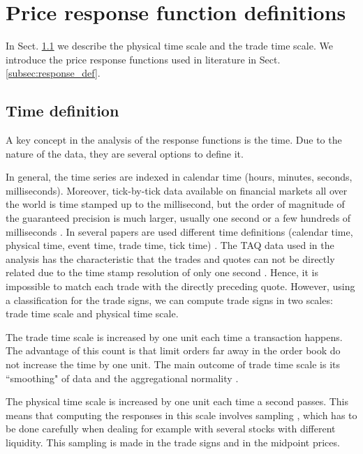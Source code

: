 \section{Price response function definitions}
\label{sec:response_functions_def}

In Sect. \ref{subsec:time_definition} we describe the physical time scale and
the trade time scale. We introduce the price response functions used in
literature in Sect. \ref{subsec:response_def}.

\subsection{Time definition}\label{subsec:time_definition}

A key concept in the analysis of the response functions is the time. Due to the
nature of the data, they are several options to define it.

In general, the time series are indexed in calendar time (hours, minutes,
seconds, milliseconds). Moreover, tick-by-tick data available on financial
markets all over the world is time stamped up to the millisecond, but the order
of magnitude of the guaranteed precision is much larger, usually one second or
a few hundreds of milliseconds \cite{market_digest,empirical_facts}. In several
papers are used different time definitions (calendar time, physical time, event
time, trade time, tick time)
\cite{empirical_facts,sampling_returns,market_making}. The TAQ data used in the
analysis has the characteristic that the trades and quotes can not be directly
related due to the time stamp resolution of only one second
\cite{Wang_2016_cross}. Hence, it is impossible to match each trade with the
directly preceding quote. However, using a classification for the trade signs,
we can compute trade signs in two scales: trade time scale and physical time
scale.

The trade time scale is increased by one unit each time a transaction happens.
The advantage of this count is that limit orders far away in the order book do
not increase the time by one unit. The main outcome of trade time scale is its
``smoothing" of data and the aggregational normality \cite{empirical_facts}.

The physical time scale is increased by one unit each time a second passes.
This means that computing the responses in this scale involves sampling
\cite{sampling_returns,Wang_2016_cross}, which has to be done carefully when
dealing for example with several stocks with different liquidity. This sampling
is made in the trade signs and in the midpoint prices.

